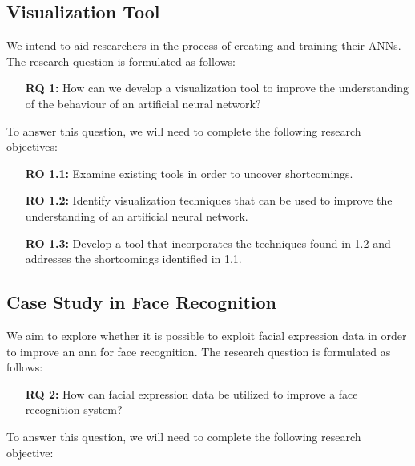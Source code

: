 \subsection{Visualization Tool}

We intend to aid researchers in the process of creating and training their ANNs. The research question is formulated as follows:

\begin{enumerate}[align=left, labelwidth=3.5em, leftmargin=!, itemindent=0em]
    \item[\textbf{RQ 1:}]How can we develop a visualization tool to improve the understanding of the behaviour of an artificial neural network?
\end{enumerate}

\noindent To answer this question, we will need to complete the following research objectives:

\begin{enumerate}[align=left, labelwidth=3.5em, leftmargin=!, itemindent=0em]
    \item[\textbf{RO 1.1:}] Examine existing tools in order to uncover shortcomings.
    \item[\textbf{RO 1.2:}] Identify visualization techniques that can be used to improve the understanding of an artificial neural network.
    \item[\textbf{RO 1.3:}]Develop a tool that incorporates the techniques found in 1.2 and addresses the shortcomings identified in 1.1.
\end{enumerate}

\subsection{Case Study in Face Recognition}

We aim to explore whether it is possible to exploit facial expression data in order to improve an \acrshort{ann} for face recognition. The research question is formulated as follows:

\begin{enumerate}[align=left, labelwidth=3.5em, leftmargin=!, itemindent=0em]
    \item[\textbf{RQ 2:}]How can facial expression data be utilized to improve a face recognition system?
\end{enumerate}

\noindent To answer this question, we will need to complete the following research objective:

